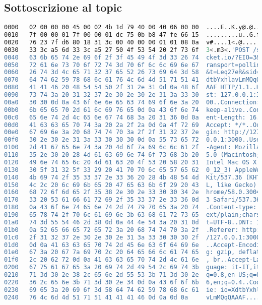 \subsection{Sottoscrizione al topic}
\label{app:packetSottoscrizione}

\begin{lstlisting}[language=bash, label={lst:packetSottoscrizioneHttq}, captionpos=b, caption={HTTP Sottoscrizione al topic "socksberry"}, basicstyle=\scriptsize\ttfamily]
0000   02 00 00 00 45 00 02 4b 1d 79 40 00 40 06 00 00  ....E..K.y@.@...
0010   7f 00 00 01 7f 00 00 01 dc 75 0b b8 47 fe 66 15  .........u..G.f.
0020   76 23 7f d6 80 18 31 3c 00 40 00 00 01 01 08 0a  v#....1<.@......
0030   33 3c a5 6d 33 3c a5 27 50 4f 53 54 20 2f 73 6f  3<.m3<.'POST /so
0040   63 6b 65 74 2e 69 6f 2f 3f 45 49 4f 3d 33 26 74  cket.io/?EIO=3&t
0050   72 61 6e 73 70 6f 72 74 3d 70 6f 6c 6c 69 6e 67  ransport=polling
0060   26 74 3d 4c 65 71 32 37 65 52 26 73 69 64 3d 58  &t=Leq27eR&sid=X
0070   64 74 62 59 78 68 6c 61 76 4c 6d 4d 51 71 51 41  dtbYxhlavLmMQqQA
0080   41 41 46 20 48 54 54 50 2f 31 2e 31 0d 0a 48 6f  AAF HTTP/1.1..Ho
0090   73 74 3a 20 31 32 37 2e 30 2e 30 2e 31 3a 33 30  st: 127.0.0.1:30
00a0   30 30 0d 0a 43 6f 6e 6e 65 63 74 69 6f 6e 3a 20  00..Connection:
00b0   6b 65 65 70 2d 61 6c 69 76 65 0d 0a 43 6f 6e 74  keep-alive..Cont
00c0   65 6e 74 2d 4c 65 6e 67 74 68 3a 20 31 36 0d 0a  ent-Length: 16..
00d0   41 63 63 65 70 74 3a 20 2a 2f 2a 0d 0a 4f 72 69  Accept: */*..Ori
00e0   67 69 6e 3a 20 68 74 74 70 3a 2f 2f 31 32 37 2e  gin: http://127.
00f0   30 2e 30 2e 31 3a 33 30 30 30 0d 0a 55 73 65 72  0.0.1:3000..User
0100   2d 41 67 65 6e 74 3a 20 4d 6f 7a 69 6c 6c 61 2f  -Agent: Mozilla/
0110   35 2e 30 20 28 4d 61 63 69 6e 74 6f 73 68 3b 20  5.0 (Macintosh;
0120   49 6e 74 65 6c 20 4d 61 63 20 4f 53 20 58 20 31  Intel Mac OS X 1
0130   30 5f 31 32 5f 33 29 20 41 70 70 6c 65 57 65 62  0_12_3) AppleWeb
0140   4b 69 74 2f 35 33 37 2e 33 36 20 28 4b 48 54 4d  Kit/537.36 (KHTM
0150   4c 2c 20 6c 69 6b 65 20 47 65 63 6b 6f 29 20 43  L, like Gecko) C
0160   68 72 6f 6d 65 2f 35 38 2e 30 2e 33 30 30 34 2e  hrome/58.0.3004.
0170   33 20 53 61 66 61 72 69 2f 35 33 37 2e 33 36 0d  3 Safari/537.36.
0180   0a 43 6f 6e 74 65 6e 74 2d 74 79 70 65 3a 20 74  .Content-type: t
0190   65 78 74 2f 70 6c 61 69 6e 3b 63 68 61 72 73 65  ext/plain;charse
01a0   74 3d 55 54 46 2d 38 0d 0a 44 4e 54 3a 20 31 0d  t=UTF-8..DNT: 1.
01b0   0a 52 65 66 65 72 65 72 3a 20 68 74 74 70 3a 2f  .Referer: http:/
01c0   2f 31 32 37 2e 30 2e 30 2e 31 3a 33 30 30 30 2f  /127.0.0.1:3000/
01d0   0d 0a 41 63 63 65 70 74 2d 45 6e 63 6f 64 69 6e  ..Accept-Encodin
01e0   67 3a 20 67 7a 69 70 2c 20 64 65 66 6c 61 74 65  g: gzip, deflate
01f0   2c 20 62 72 0d 0a 41 63 63 65 70 74 2d 4c 61 6e  , br..Accept-Lan
0200   67 75 61 67 65 3a 20 69 74 2d 49 54 2c 69 74 3b  guage: it-IT,it;
0210   71 3d 30 2e 38 2c 65 6e 2d 55 53 3b 71 3d 30 2e  q=0.8,en-US;q=0.
0220   36 2c 65 6e 3b 71 3d 30 2e 34 0d 0a 43 6f 6f 6b  6,en;q=0.4..Cook
0230   69 65 3a 20 69 6f 3d 58 64 74 62 59 78 68 6c 61  ie: io=XdtbYxhla
0240   76 4c 6d 4d 51 71 51 41 41 41 46 0d 0a 0d 0a     vLmMQqQAAAF....


\end{lstlisting}
